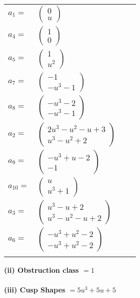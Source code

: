 \documentclass[1p]{elsarticle_modified}
\theoremstyle{definition}
\begin{document}
\begin{tabular}{m{7pt} m{180pt} m{7pt} m{180pt} }
\flushright $a_{1}=$&$\begin{pmatrix}0\\u\end{pmatrix}$ \\
\flushright $a_{4}=$&$\begin{pmatrix}1\\0\end{pmatrix}$ \\
\flushright $a_{5}=$&$\begin{pmatrix}1\\u^2\end{pmatrix}$ \\
\flushright $a_{7}=$&$\begin{pmatrix}-1\\- u^3-1\end{pmatrix}$ \\
\flushright $a_{8}=$&$\begin{pmatrix}- u^3-2\\- u^3-1\end{pmatrix}$ \\
\flushright $a_{2}=$&$\begin{pmatrix}2 u^3- u^2- u+3\\u^3- u^2+2\end{pmatrix}$ \\
\flushright $a_{9}=$&$\begin{pmatrix}- u^3+u-2\\-1\end{pmatrix}$ \\
\flushright $a_{10}=$&$\begin{pmatrix}u\\u^3+1\end{pmatrix}$ \\
\flushright $a_{3}=$&$\begin{pmatrix}u^3- u+2\\u^3- u^2- u+2\end{pmatrix}$ \\
\flushright $a_{6}=$&$\begin{pmatrix}- u^3+u^2-2\\- u^3+u^2-2\end{pmatrix}$\\&\end{tabular}
\flushleft \textbf{(ii) Obstruction class $= 1$}\\~\\
\flushleft \textbf{(iii) Cusp Shapes $= 5 u^3+5 u+5$}\\~\\
\end{document}

